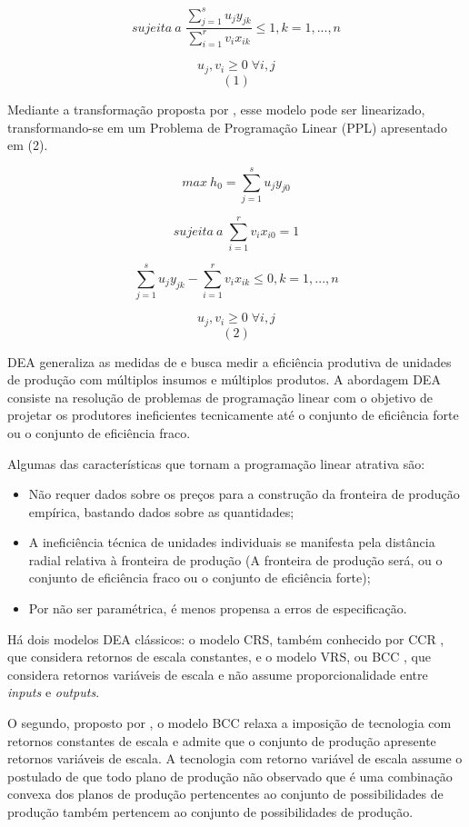 $$sujeita\ a\; \frac{\displaystyle\sum_{j=1}^{s} u_j y_{jk}}{\displaystyle\sum_{i=1}^{r} v_i x_{ik}} \leq 1, k=1,...,n$$

$$u_j,v_i\geq0 \; \forall i, j$$
$$(1)$$

Mediante a transformação proposta por , esse modelo pode ser linearizado, transformando-se em um Problema de Programação Linear (PPL) apresentado em (2).

$$max\ h_0=\displaystyle\sum_{j=1}^{s} u_j y_{j0} $$

$$sujeita\ a\; \displaystyle\sum_{i=1}^{r} v_i x_{i0}=1$$

$$ \displaystyle\sum_{j=1}^{s} u_j y_{jk} - \displaystyle\sum_{i=1}^{r} v_i x_{ik}\leq 0, k=1,...,n$$



$$u_j,v_i\geq0 \; \forall i, j$$
$$(2)$$ 

DEA generaliza as medidas de  e busca medir a eficiência produtiva de unidades de produção com múltiplos insumos e múltiplos produtos. A abordagem DEA consiste na resolução de problemas de programação linear com o objetivo de projetar os produtores ineficientes tecnicamente até o conjunto de eficiência forte ou o conjunto de eficiência fraco.


Algumas das características que tornam a programação linear atrativa são:



\begin{itemize}
	\item Não requer dados sobre os preços para a construção da fronteira de produção empírica, bastando dados sobre as quantidades;
	\item A ineficiência técnica de unidades individuais se manifesta pela distância radial relativa à fronteira de produção (A fronteira de produção será, ou o conjunto de eficiência fraco ou o conjunto de eficiência forte);
	\item Por não ser paramétrica, é menos propensa a erros de especificação.
\end{itemize}


Há dois modelos DEA clássicos: o modelo CRS, também conhecido por CCR , que considera retornos de escala constantes, e o modelo VRS, ou BCC , que considera retornos variáveis de escala e não assume proporcionalidade entre \textit{inputs} e \textit{outputs}.

O segundo, proposto por , o modelo BCC relaxa a imposição de tecnologia com retornos constantes de escala e admite que o conjunto de produção apresente retornos variáveis de escala. A tecnologia com retorno variável de escala assume o postulado de que todo plano de produção não observado que é uma combinação convexa dos planos de produção pertencentes ao conjunto de possibilidades de produção também
pertencem ao conjunto de possibilidades de produção. 


